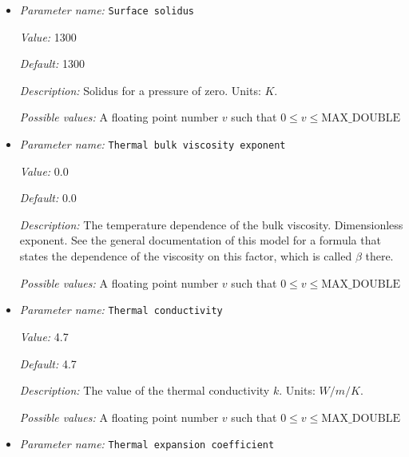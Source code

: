 \begin{itemize}
{\it Value:} 0.0


{\it Default:} 0.0


{\it Description:} The value of the compressibility of the solid matrix. Units: $1/Pa$.


{\it Possible values:} A floating point number $v$ such that $0 \leq v \leq \text{MAX\_DOUBLE}$
\item {\it Parameter name:} {\tt Surface solidus}
\label{parameters:Material model/Melt global/Surface solidus}


{\it Value:} 1300


{\it Default:} 1300


{\it Description:} Solidus for a pressure of zero. Units: $K$.


{\it Possible values:} A floating point number $v$ such that $0 \leq v \leq \text{MAX\_DOUBLE}$
\item {\it Parameter name:} {\tt Thermal bulk viscosity exponent}
\label{parameters:Material model/Melt global/Thermal bulk viscosity exponent}


{\it Value:} 0.0


{\it Default:} 0.0


{\it Description:} The temperature dependence of the bulk viscosity. Dimensionless exponent. See the general documentation of this model for a formula that states the dependence of the viscosity on this factor, which is called $\beta$ there.


{\it Possible values:} A floating point number $v$ such that $0 \leq v \leq \text{MAX\_DOUBLE}$
\item {\it Parameter name:} {\tt Thermal conductivity}
\label{parameters:Material model/Melt global/Thermal conductivity}


{\it Value:} 4.7


{\it Default:} 4.7


{\it Description:} The value of the thermal conductivity $k$. Units: $W/m/K$.


{\it Possible values:} A floating point number $v$ such that $0 \leq v \leq \text{MAX\_DOUBLE}$
\item {\it Parameter name:} {\tt Thermal expansion coefficient}
\label{parameters:Material model/Melt global/Thermal expansion coefficient}



\end{itemize}
